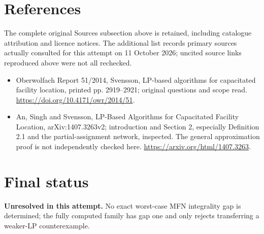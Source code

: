 \documentclass[11pt]{article}
\begin{document}
\section{References}
The complete original Sources subsection above is retained, including catalogue attribution and licence notices. The additional list records primary sources actually consulted for this attempt on 11 October 2026; uncited source links reproduced above were not all rechecked.
\begin{itemize}
\item Oberwolfach Report 51/2014, Svensson, LP-based algorithms for capacitated facility location, printed pp. 2919--2921; original questions and scope read. \url{https://doi.org/10.4171/owr/2014/51}.
\item An, Singh and Svensson, LP-Based Algorithms for Capacitated Facility Location, arXiv:1407.3263v2; introduction and Section 2, especially Definition 2.1 and the partial-assignment network, inspected. The general approximation proof is not independently checked here. \url{https://arxiv.org/html/1407.3263}.
\end{itemize}
\section{Final status}
\textbf{Unresolved in this attempt.} No exact worst-case MFN integrality gap is determined; the fully computed family has gap one and only rejects transferring a weaker-LP counterexample.
\end{document}
